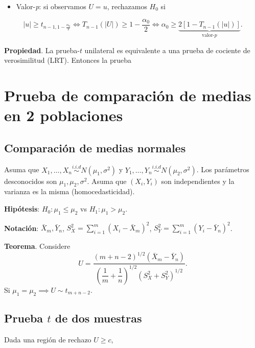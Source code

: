 \documentclass[
  12pt,
]{book}
\providecommand{\tightlist}{%
  \setlength{\itemsep}{0pt}\setlength{\parskip}{0pt}}
\begin{document}
\begin{itemize}
\tightlist
\item
  Valor-\emph{p}: si observamos \(U=u\), rechazamos \(H_0\) si
\end{itemize}

\[
| u | \geq t_{n-1,1-\frac{\alpha_0}2} \Leftrightarrow T_{n-1}( | U | )\geq 1-\dfrac{\alpha_0}2 \Leftrightarrow \alpha_0\geq \underbrace{2[1-T_{n-1}( | u | )]}_{\text{valor-}p}.
\]

\textbf{Propiedad}. La prueba-\(t\) unilateral es equivalente a una prueba de cociente
de verosimilitud (LRT). Entonces la prueba

\hypertarget{prueba-de-comparaciuxf3n-de-medias-en-2-poblaciones}{%
\chapter{Prueba de comparación de medias en 2 poblaciones}\label{prueba-de-comparaciuxf3n-de-medias-en-2-poblaciones}}

\hypertarget{comparaciuxf3n-de-medias-normales}{%
\section{Comparación de medias normales}\label{comparaciuxf3n-de-medias-normales}}

Asuma que \(X_1,\dots, X_n\overset{i.i.d}{\sim} N(\mu_1,\sigma^2)\) y \(Y_1,\dots, Y_n\overset{i.i.d}{\sim} N(\mu_2,\sigma^2)\). Los parámetros desconocidos son
\(\mu_1,\mu_2,\sigma^2\). Asuma que \((X_i,Y_i)\) son independientes y la varianza
es la misma (homocedasticidad).

\textbf{Hipótesis}: \(H_0: \mu_1\leq\mu_2\) vs \(H_1: \mu_1>\mu_2\).

\textbf{Notación}: \(\bar X_m,\bar Y_n\), \(\displaystyle S_X^2 = \sum_{i=1}^m(X_i-\bar X_m)^2\),
\(\displaystyle S_Y^2 = \sum_{i=1}^m(Y_i-\bar Y_n)^2\).

\textbf{Teorema}. Considere
\[
U = \dfrac{(m+n-2)^{1/2}(\bar X_m-\bar Y_n)}{\left(\dfrac 1m+\dfrac 1n\right)^{1/2}(S_X^2+S_Y^2)^{1/2}}.
\] Si
\(\mu_1=\mu_2 \implies U\sim t_{m+n-2}.\)

\hypertarget{prueba-t-de-dos-muestras}{%
\section{\texorpdfstring{Prueba \(t\) de dos muestras}{Prueba t de dos muestras}}\label{prueba-t-de-dos-muestras}}

Dada una región de rechazo \(U\geq c\),
\end{document}
